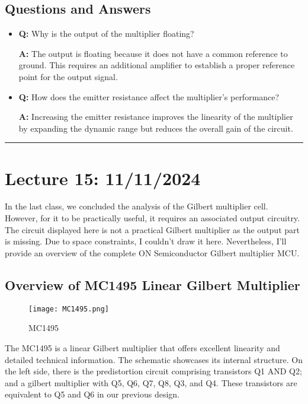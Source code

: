 \documentclass[a4paper,9pt,twoside,openany,twocolumn]{memoir}
\begin{document}
\subsection*{Questions and Answers}
\begin{itemize}
    \item \textbf{Q:} Why is the output of the multiplier floating?
    
    \textbf{A:} The output is floating because it does not have a common reference to ground. This requires an additional amplifier to establish a proper reference point for the output signal.
    
    \item \textbf{Q:} How does the emitter resistance affect the multiplier's performance?
    
    \textbf{A:} Increasing the emitter resistance improves the linearity of the multiplier by expanding the dynamic range but reduces the overall gain of the circuit.
\end{itemize}
\begin{center}\rule{0.5\linewidth}{0.5pt}\end{center}

\section*{Lecture 15: 11/11/2024}

In the last class, we concluded the analysis of the Gilbert multiplier cell. However, for it to be practically useful, it requires an associated output circuitry. The circuit displayed here is not a practical Gilbert multiplier as the output part is missing. Due to space constraints, I couldn't draw it here. Nevertheless, I'll provide an overview of the complete ON Semiconductor Gilbert multiplier MCU.

\subsection{Overview of MC1495 Linear Gilbert Multiplier}
\begin{figure}[h]
    \centering
    \texttt{[image: MC1495.png]}
    \caption{MC1495}
    \label{fig:gilbert_multiplier}
\end{figure}

The MC1495 is a linear Gilbert multiplier that offers excellent linearity and detailed technical information. The schematic showcases its internal structure. On the left side, there is the predistortion circuit comprising transistors Q1 AND Q2; and a gilbert multiplier with Q5, Q6, Q7, Q8, Q3, and Q4. These transistors are equivalent to Q5 and Q6 in our previous design.
\end{document}

